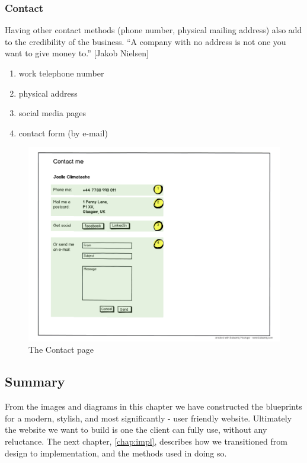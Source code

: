 \documentclass{l3proj}
\begin{document}
\subsubsection{Contact}
Having other contact methods (phone number, physical mailing address) also add
to the credibility of the business. ``A company with no address is not one you
want to give money to.'' [Jakob Nielsen]
\begin{enumerate} \itemsep1pt \parskip0pt 
	\item work telephone number
	\item physical address
	\item social media pages
	\item contact form (by e-mail)
\end{enumerate}

\begin{figure}
\label{wireframes:contact}
\begin{center}
\includegraphics[width=\linewidth, trim = 0px 40px 0px 220px]
	{wireframes/contact}
\caption{The Contact page}
\end{center}
\end{figure}

\subsection{Summary}
From the images and diagrams in this chapter we have constructed the blueprints
for a modern, stylish, and most significantly - user friendly website.
Ultimately the website we want to build is one the client can fully use, without
any reluctance. The next chapter, \ref{chap:impl}, describes how we transitioned
from design to implementation, and the methods used in doing so.
\end{document}

